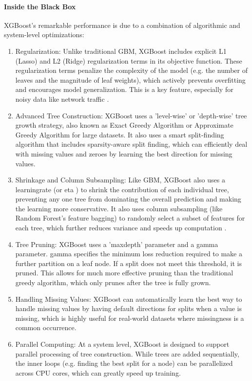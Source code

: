 \paragraph{Inside the Black Box} 
XGBoost's remarkable performance is due to a combination of algorithmic and system-level optimizations:
\begin{enumerate}[noitemsep] 
\item Regularization: Unlike traditional GBM, XGBoost includes explicit L1 (Lasso) and L2 (Ridge) regularization terms in its objective function. These regularization terms penalize the complexity of the model (e.g. the number of leaves and the magnitude of leaf weights), which actively prevents overfitting and encourages model generalization. This is a key feature, especially for noisy data like network traffic \parencite{habeeb2024two}.
\item Advanced Tree Construction: XGBoost uses a 'level-wise' or 'depth-wise' tree growth strategy, also known as Exact Greedy Algorithm or Approximate Greedy Algorithm for large datasets. It also uses a smart split-finding algorithm that includes sparsity-aware split finding, which can efficiently deal with missing values and zeroes by learning the best direction for missing values.
\item Shrinkage and Column Subsampling: Like GBM, XGBoost also uses a learning\textunderscore rate (or eta ) to shrink the contribution of each individual tree, preventing any one tree from dominating the overall prediction and making the learning more conservative. It also uses column subsampling (like Random Forest's feature bagging) to randomly select a subset of features for each tree, which further reduces variance and speeds up computation \parencite{almutairi2025intrusion}.
\item Tree Pruning: XGBoost uses a 'max\textunderscore depth' parameter and a gamma parameter. gamma specifies the minimum loss reduction required to make a further partition on a leaf node. If a split does not meet this threshold, it is pruned. This allows for much more effective pruning than the traditional greedy algorithm, which only prunes after the tree is fully grown.
\item Handling Missing Values: XGBoost can automatically learn the best way to handle missing values by having default directions for splits when a value is missing, which is highly useful for real-world datasets where missingness is a common occurrence.
\item Parallel Computing: At a system level, XGBoost is designed to support parallel processing of tree construction. While trees are added sequentially, the inner loops (e.g. finding the best split for a node) can be parallelized across CPU cores, which can greatly speed up training.
\end{enumerate} 


